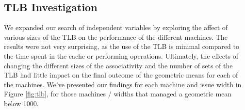 \documentclass[paper=a4, fontsize=12pt]{scrartcl} %
\numberwithin{equation}{section} %
\numberwithin{figure}{section} %
\numberwithin{table}{section} %
\begin{document}
\subsection{TLB Investigation}

We expanded our search of independent variables by exploring the affect of various sizes of the TLB on the performance of the different machines. The results were not very surprising, as the use of the TLB is minimal compared to the time spent in the cache or performing operations. Ultimately, the effects of changing the different sizes of the associativity and the number of sets of the TLB had little impact on the final outcome of the geometric means for each of the machines. We've presented our findings for each machine and issue width in Figure \ref{fig:tlb}, for those machines / widths that managed a geometric mean below 1000.
\end{document}
